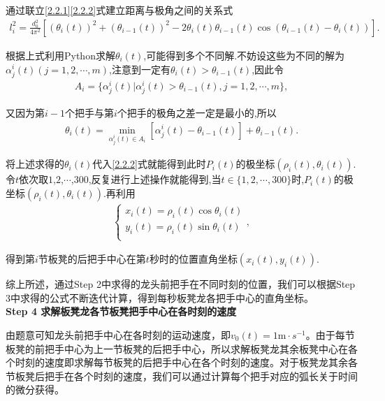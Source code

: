 \documentclass{cumcmthesis}
\begin{document}
    \par 通过联立\eqref{2.2.1}\eqref{2.2.2}式建立距离与极角之间的关系式
    \begin{align}
        l_{i}^{2}=\frac{d_{0}^{2}}{4\pi ^2}[(\theta _{i}(t))^2+(\theta _{i-1}(t))^2 - 2\theta _{i}(t)\theta _{i-1}(t)\cos (\theta _{i-1}(t)-\theta _{i}(t))] .\label{2.0.0}
        \end{align}
    \par 根据上式利用Python求解\(\theta _{i}(t)\),可能得到多个不同解.不妨设这些为不同的解为\(\alpha _{j}^{i}(t) (j = 1,2,\cdots ,m)\),注意到一定有\(\theta _{i}(t)>\theta _{i-1}(t)\),因此令
    \begin{align}\label{1.........9}
    A_i = \{ \alpha _{j}^{i}(t) |\alpha _{j}^{i}(t) >\theta _{i-1}(t),j = 1,2,\cdots ,m \},
    \end{align}
    \par 又因为第\(i - 1\)个把手与第$i$个把手的极角之差一定是最小的,所以
    \begin{align}\label{1.........10}
        \theta _i(t)=\underset{\alpha _{j}^{i}(t)\in A_i}{\min}\left[ \alpha _{j}^{i}\left( t \right) -\theta _{i-1}\left( t \right) \right] +\theta _{i-1}\left( t \right) .  
        \end{align}
        \par 将上述求得的\(\theta _i(t)\)代入\eqref{2.2.2}式就能得到此时\(P_{i}(t)\)的极坐标\((\rho _{i}(t),\theta _{i}(t))\).令\(t\)依次取\(1\),\(2\),\(\cdots\),\(300\),反复进行上述操作就能得到,当\(t\in \{ 1,2,\cdots ,300 \}\)时,\(P_{i}(t)\)的极坐标\((\rho _{i}(t),\theta _{i}(t))\).再利用
        \begin{align}
        \begin{cases}
        x_{i}(t)=\rho _{i}(t)\cos \theta _{i}(t)\\
        y_{i}(t)=\rho _{i}(t)\sin \theta _{i}(t)\\
        \end{cases},\label{1.........11} 
        \end{align}
        \par 得到第$i$节板凳的后把手中心在第\(t\)秒时的位置直角坐标\((x_i(t),y_i(t))\).
    \par 综上所述，通过Step 2中求得的龙头前把手在不同时刻的位置，我们可以根据Step 3中求得的公式不断迭代计算，得到每秒板凳龙各把手中心的直角坐标。
 \\\textbf{Step 4 求解板凳龙各节板凳把手中心在各时刻的速度}
\par 由题意可知龙头前把手中心在各时刻的运动速度，即\(v_0(t) = 1\mathrm{m}\cdot s^{-1}\)。由于每节板凳的前把手中心为上一节板凳的后把手中心，所以求解板凳龙其余板凳中心在各个时刻的速度即求解每节板凳的后把手中心在各个时刻的速度。对于板凳龙其余各节板凳后把手在各个时刻的速度，我们可以通过计算每个把手对应的弧长关于时间的微分获得。
\end{document}
